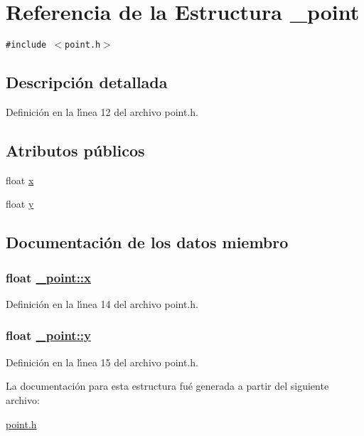 \hypertarget{struct__point}{
\section{Referencia de la Estructura \_\-point}
\label{struct__point}
}
{\tt \#include $<$point.h$>$}



\subsection{Descripci\'{o}n detallada}




Definici\'{o}n en la l\'{\i}nea 12 del archivo point.h.\subsection*{Atributos p\'{u}blicos}
\begin{CompactItemize}
\item 
float \hyperlink{struct__point_767ac72154b321228732c3dad513eb27_767ac72154b321228732c3dad513eb27}{x}
\item 
float \hyperlink{struct__point_8959fb193a9a1f2cb450a79d3dfc5b0e_8959fb193a9a1f2cb450a79d3dfc5b0e}{y}
\end{CompactItemize}


\subsection{Documentaci\'{o}n de los datos miembro}
\hypertarget{struct__point_767ac72154b321228732c3dad513eb27_767ac72154b321228732c3dad513eb27}{
\subsubsection[x]{\setlength{\rightskip}{0pt plus 5cm}float \hyperlink{struct__point_767ac72154b321228732c3dad513eb27_767ac72154b321228732c3dad513eb27}{\_\-point::x}}}
\label{struct__point_767ac72154b321228732c3dad513eb27_767ac72154b321228732c3dad513eb27}




Definici\'{o}n en la l\'{\i}nea 14 del archivo point.h.\hypertarget{struct__point_8959fb193a9a1f2cb450a79d3dfc5b0e_8959fb193a9a1f2cb450a79d3dfc5b0e}{
\subsubsection[y]{\setlength{\rightskip}{0pt plus 5cm}float \hyperlink{struct__point_8959fb193a9a1f2cb450a79d3dfc5b0e_8959fb193a9a1f2cb450a79d3dfc5b0e}{\_\-point::y}}}
\label{struct__point_8959fb193a9a1f2cb450a79d3dfc5b0e_8959fb193a9a1f2cb450a79d3dfc5b0e}




Definici\'{o}n en la l\'{\i}nea 15 del archivo point.h.

La documentaci\'{o}n para esta estructura fu\'{e} generada a partir del siguiente archivo:\begin{CompactItemize}
\item 
\hyperlink{point_8h}{point.h}\end{CompactItemize}
